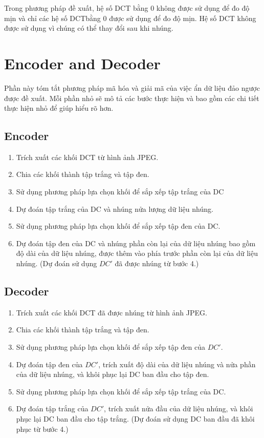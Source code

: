 Trong phương pháp đề xuất, hệ số DCT bằng 0 không được sử dụng để đo độ mịn và chỉ các hệ số DCTbằng 0 được sử dụng để đo độ mịn. Hệ số DCT không được sử dụng vì chúng có thể thay đổi sau khi nhúng.

\section{Encoder and Decoder}
Phần này tóm tắt phương pháp mã hóa và giải mã của việc ẩn dữ liệu đảo ngược được đề xuất. Mỗi phần nhỏ sẽ mô tả các bước thực hiện và bao gồm các chi tiết thực hiện nhỏ để giúp hiểu rõ hơn. 

\subsection{Encoder}
\begin{enumerate}
    \item Trích xuất các khối DCT từ hình ảnh JPEG.
    \item Chia các khối thành tập trắng và tập đen. 
    \item Sử dụng phương pháp lựa chọn khối để sắp xếp tập trắng của DC
    \item Dự đoán tập trắng của  DC và nhúng nửa lượng dữ liệu nhúng.
    \item Sử dụng phương pháp lựa chọn khối để sắp xếp tập đen của DC.
    \item Dự đoán tập đen của DC và nhúng phần còn lại của dữ liệu nhúng bao gồm độ dài của dữ liệu nhúng, được thêm vào phía trước phần còn lại của dữ liệu nhúng. (Dự đoán sử dụng $DC'$ đã được nhúng từ bước 4.) 
\end{enumerate}

\subsection{Decoder}

\begin{enumerate}
    \item Trích xuất các khối DCT đã được nhúng từ hình ảnh JPEG. 
    \item Chia các khối thành tập trắng và tập đen.
    \item Sử dụng phương pháp lựa chọn khối để sắp xếp tập đen của $DC'$.
    \item Dự đoán tập đen của $DC'$, trích xuất độ dài của dữ liệu nhúng và nửa phần của dữ liệu nhúng, và khôi phục lại DC ban đầu cho tập đen.
    \item Sử dụng phương pháp lựa chọn khối để sắp xếp tập trắng của DC.
    \item Dự đoán tập trắng của $DC'$, trích xuất nửa đầu của dữ liệu nhúng, và khôi phục lại DC ban đầu cho tập trắng. (Dự đoán sử dụng DC ban đầu đã khôi phục từ bước 4.) 
\end{enumerate}

